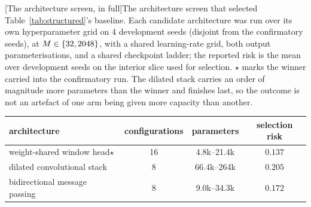 
\begin{center}
\begin{minipage}{\linewidth}\small\centering
{}[The architecture screen, in full]{The architecture screen that selected Table~\ref{tab:structured}'s
baseline. Each candidate architecture was run over its own hyperparameter grid on
4 development seeds (disjoint from the confirmatory seeds),
at $M \in \{32, 2048\}$, with a shared learning-rate grid,
both output parameterisations, and a shared checkpoint ladder; the reported risk is
the mean over development seeds on the interior slice used for selection. $\star$
marks the winner carried into the confirmatory run. The dilated stack carries an
order of magnitude more parameters than the winner and finishes last, so the
outcome is not an artefact of one arm being given more capacity than another.}
\label{tab:screening}
\begin{tabular}{lccc}
\toprule
architecture & configurations & parameters & selection risk \\
\midrule
weight-shared window head\;$\star$ & 16 & 4.8k--21.4k & $0.137$ \\
dilated convolutional stack & 8 & 66.4k--264k & $0.205$ \\
bidirectional message passing & 8 & 9.0k--34.3k & $0.172$ \\
\bottomrule
\end{tabular}
\end{minipage}
\end{center}
